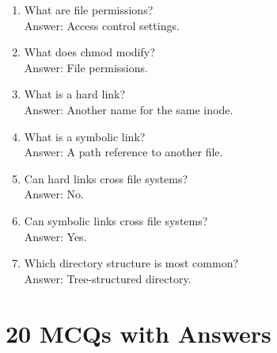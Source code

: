 \begin{enumerate}
\item What are file permissions?\\
Answer: Access control settings.

\item What does chmod modify?\\
Answer: File permissions.

\item What is a hard link?\\
Answer: Another name for the same inode.

\item What is a symbolic link?\\
Answer: A path reference to another file.

\item Can hard links cross file systems?\\
Answer: No.

\item Can symbolic links cross file systems?\\
Answer: Yes.

\item Which directory structure is most common?\\
Answer: Tree-structured directory.
\end{enumerate}

\section{20 MCQs with Answers}

